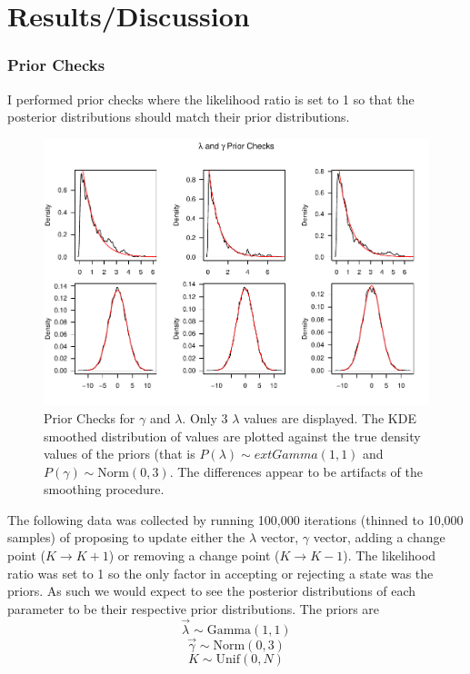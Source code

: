 \documentclass[11pt,a4paper]{article}
\numberwithin{equation}{section}
\begin{document}
\hypertarget{resultsdiscussion}{%
\section{Results/Discussion}\label{resultsdiscussion}}

\hypertarget{prior-checks-1}{%
\subsubsection{Prior Checks}\label{prior-checks-1}}

I performed prior checks where the likelihood ratio is set to 1 so that
the posterior distributions should match their prior distributions.

\begin{figure}
\centering
\includegraphics{thesis_draft_files/figure-latex/prior_checks_2c-1.pdf}
\caption{\label{fig:pc2c} Prior Checks for \(\gamma\) and \(\lambda\).
Only 3 \(\lambda\) values are displayed. The KDE smoothed distribution
of values are plotted against the true density values of the priors
(that is \(P(\lambda) \sim ext{Gamma}(1,1)\) and
\(P(\gamma) \sim \text{Norm}(0,3)\). The differences appear to be
artifacts of the smoothing procedure.}
\end{figure}

The following data was collected by running 100,000 iterations (thinned
to 10,000 samples) of proposing to update either the \(\lambda\) vector,
\(\gamma\) vector, adding a change point (\(K \rightarrow K + 1\)) or
removing a change point (\(K \rightarrow K - 1\)). The likelihood ratio
was set to 1 so the only factor in accepting or rejecting a state was
the priors. As such we would expect to see the posterior distributions
of each parameter to be their respective prior distributions. The priors
are \[\vec\lambda \sim \text{Gamma}(1,1)\]
\[\vec\gamma \sim \text{Norm}(0,3)\] \[K \sim \text{Unif}(0,N)\]
\end{document}

